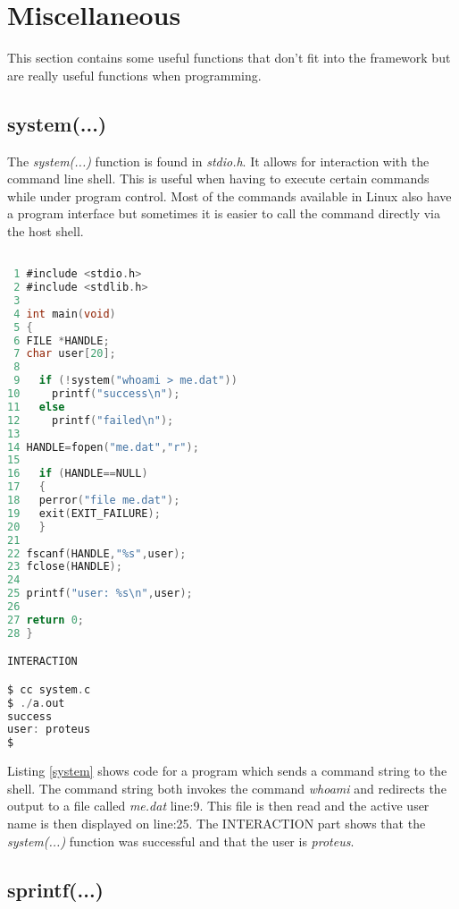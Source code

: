 \section{Miscellaneous}

This section contains some useful functions that don't fit into the framework but are really useful functions when programming. 

\subsection{system(...)}


The \textit{system(...)} function is found in \textit{stdio.h}. It allows for interaction with the command line shell. This is useful when having to execute certain commands while under program control. Most of the commands available in Linux also have a program interface but sometimes it is easier to call the command directly via the host shell.\\

\begin{lstlisting}[language=C,showstringspaces=false, caption={File: system.c},captionpos=b,label=system]

 1 #include <stdio.h>
 2 #include <stdlib.h>
 3 
 4 int main(void)
 5 {
 6 FILE *HANDLE;
 7 char user[20];
 8 
 9   if (!system("whoami > me.dat"))
10     printf("success\n");
11   else
12     printf("failed\n");
13 
14 HANDLE=fopen("me.dat","r");
15 
16   if (HANDLE==NULL)
17   {
18   perror("file me.dat");
19   exit(EXIT_FAILURE);
20   }
21 
22 fscanf(HANDLE,"%s",user);
23 fclose(HANDLE);
24 
25 printf("user: %s\n",user);
26 
27 return 0;
28 }

INTERACTION

$ cc system.c
$ ./a.out
success
user: proteus
$

\end{lstlisting}

Listing \ref{system} shows code for a program which sends a command string to the shell. The command string both invokes the command \textit{whoami} and redirects the output to a file called \textit{me.dat} line:9. This file is then read and the active user name is then displayed on line:25. The INTERACTION part shows that the \textit{system(...)} function was successful and that the user is \textit{proteus}.

\subsection{sprintf(...)}

